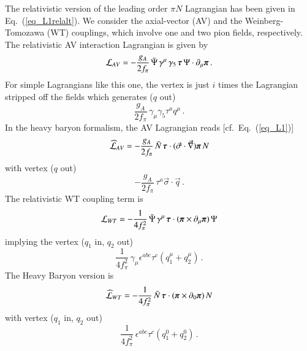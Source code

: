 \documentclass[sort&compress,preprint,3p]{elsarticle}
\begin{document}
The relativistic version of the leading order $\pi N$
Lagrangian has been given in Eq.~(\ref{eq_L1relalt}).
We consider the axial-vector (AV) and the Weinberg-Tomozawa (WT)
couplings, which involve one and two pion fields, respectively.
The relativistic AV interaction Lagrangian is given by
%
\begin{equation}
\mathcal{L}_{AV} = - \frac{g_A}{2 f_\pi} \, \bar{\Psi} \,\gamma^\mu \,
\gamma_5 \, \mbox{\boldmath $\tau$} 
\, \Psi \cdot \partial_\mu \mbox{\boldmath $\pi$} 
\,.
\end{equation}
%
For simple Lagrangians like this one,
the vertex is just
$i$ times the Lagrangian stripped off the fields which generates ($q$ out)
%
\begin{equation}
\frac{ g_A}{2 f_\pi} \, \gamma_\mu \gamma_5  \tau^a q^\mu
\,.
\label{eq_VAVrel}
\end{equation}
%
In the heavy baryon formalism, the AV Lagrangian reads
[cf.\ Eq.~(\ref{eq_L1})]
%
\begin{equation}
\widehat{\cal L}_{AV} = - \frac{g_A}{2 f_\pi} \, \bar{N}  \,
\mbox{\boldmath $\tau$} \cdot 
(\vec \sigma \cdot \vec \nabla) \mbox{\boldmath $\pi$} 
\, N 
\end{equation}
%
with vertex ($q$ out) 
%
\begin{equation}
-\frac{g_A}{2 f_\pi} \, \tau^a
\vec \sigma \cdot \vec{q}
\,.
\label{eq_VAV}
\end{equation}
%
The relativistic WT coupling term is
%
\begin{equation}
\mathcal{L}_{WT} = - \frac{1}{4 f_\pi^2} \, \bar{\Psi} \,\gamma^\mu \,
\mbox{\boldmath $\tau$} \cdot (\mbox{\boldmath $\pi$}\times 
\partial_\mu \mbox{\boldmath $\pi$})
\, \Psi 
\end{equation}
%
implying the vertex ($q_1$ in, $q_2$ out)
%
\begin{equation}
\frac{1}{4 f_\pi^2} \, \gamma_\mu \epsilon^{abc}  \tau^c
(q_1^\mu + q_2^\mu)
\,.
\label{eq_VWTrel}
\end{equation}
%
The Heavy Baryon version is 
%
\begin{equation}
\widehat{\cal L}_{WT} = - \frac{1}{4 f_\pi^2} \, \bar{N}  \,
\mbox{\boldmath $\tau$} \cdot (\mbox{\boldmath $\pi$}
\times \partial_0 \mbox{\boldmath $\pi$})
\, N 
\label{eq_LhatWT}
\end{equation}
with vertex ($q_1$ in, $q_2$ out)
\begin{equation}
\frac{1}{4 f_\pi^2} \, \epsilon^{abc}  \tau^c
(q_1^0 + q_2^0)
\,.
\label{eq_VWT}
\end{equation}
\end{document}
